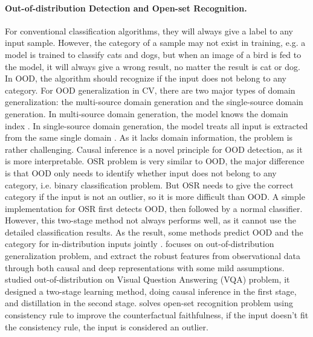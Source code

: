 \documentclass{article}
\begin{document}
\paragraph{Out-of-distribution Detection and Open-set Recognition.}
For conventional classification algorithms, they will always give a label to any input sample. However,
the category of a sample may not exist in training, e.g. a model is trained to classify cats and dogs,
but when an image of a bird is fed to the model, it will always give a wrong result, no matter the result
is cat or dog. In OOD, the algorithm should recognize if the input does not belong to any category.
For OOD generalization in CV, there are two major types of domain generalization: the multi-source
domain generation and the single-source domain generation. In multi-source domain generation, the model
knows the domain index \cite{ajakan2014domain,arjovsky2019invariant,li2018learning}.
In single-source domain generation, the model treats all input is extracted from the same single domain
\cite{albuquerque2019generalizing,hendrycks2021many,peng2019moment,wang2019learning}.
As it lacks domain information, the problem is rather challenging. Causal inference is a novel principle
for OOD detection, as it is more interpretable.
%
OSR problem is very similar to OOD, the major difference is that OOD only needs to identify whether input
does not belong to any category, i.e. binary classification problem. But OSR needs to give the correct
category if the input is not an outlier, so it is more difficult than OOD. A simple implementation for
OSR first detects OOD, then followed by a normal classifier. However, this two-stage method not always
performs well, as it cannot use the detailed classification results. As the result, some methods predict
OOD and the category for in-distribution inputs jointly \cite{scheirer2012toward,gunther2017toward,scheirer2014probability}.
%
\cite{mao2022causal} focuses on out-of-distribution
generalization problem, and extract the robust features from observational data through both causal
and deep representations with some mild assumptions. \cite{pan2022causal} studied out-of-distribution
on Visual Question Answering (VQA) problem, it designed a two-stage learning method, doing causal inference
in the first stage, and distillation in the second stage.
%
\cite{yue2021counterfactual} solves open-set recognition problem using consistency rule to improve
the counterfactual faithfulness, if the input doesn't fit the consistency rule, the input is considered an outlier.
\end{document}
